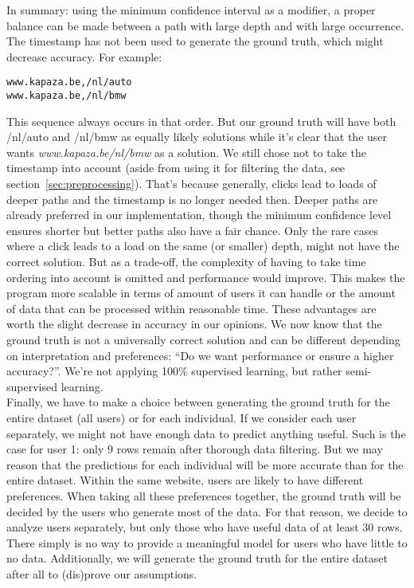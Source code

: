 In summary: using the minimum confidence interval as a modifier, a proper balance can be made between a path with large depth and with large occurrence. 
\\[2ex]
The timestamp has not been used to generate the ground truth, which might decrease accuracy. For example:
\begin{verbatim}
www.kapaza.be,/nl/auto
www.kapaza.be,/nl/bmw
\end{verbatim}
This sequence always occurs in that order. But our ground truth will have both /nl/auto and /nl/bmw as equally likely solutions while it's clear that the user wants \textit{www.kapaza.be/nl/bmw} as a solution. We still chose not to take the timestamp into account (aside from using it for filtering the data, see section~\ref{sec:preprocessing}). That's because generally, clicks lead to loads of deeper paths and the timestamp is no longer needed then. Deeper paths are already preferred in our implementation, though the minimum confidence level ensures shorter but better paths also have a fair chance. Only the rare cases where a click leads to a load on the same (or smaller) depth, might not have the correct solution. But as a trade-off, the complexity of having to take time ordering into account is omitted and performance would improve. This makes the program more scalable in terms of amount of users it can handle or the amount of data that can be processed within reasonable time. These advantages are worth the slight decrease in accuracy in our opinions. We now know that the ground truth is not a universally correct solution and can be different depending on interpretation and preferences: ``Do we want performance or ensure a higher accuracy?''. We're not applying 100\% supervised learning, but rather semi-supervised learning.
\\[2ex]
Finally, we have to make a choice between generating the ground truth for the entire dataset (all users) or for each individual. If we consider each user separately, we might not have enough data to predict anything useful. Such is the case for user 1: only 9 rows remain after thorough data filtering. But we may reason that the predictions for each individual will be more accurate than for the entire dataset. Within the same website, users are likely to have different preferences. When taking all these preferences together, the ground truth will be decided by the users who generate most of the data. For that reason, we decide to analyze users separately, but only those who have useful data of at least 30 rows. There simply is no way to provide a meaningful model for users who have little to no data. Additionally, we will generate the ground truth for the entire dataset after all to (dis)prove our assumptions.


